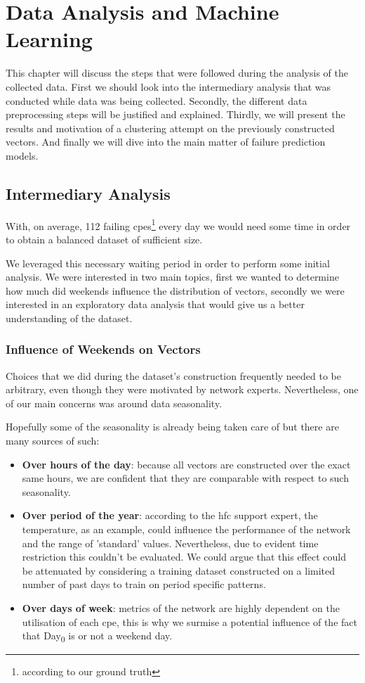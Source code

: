 \chapter{Data Analysis and Machine Learning}
This chapter will discuss the steps that were followed during the analysis of the collected data. First we should look into the intermediary analysis that was conducted while data was being collected. Secondly, the different data preprocessing steps will be justified and explained. Thirdly, we will present the results and motivation of a clustering attempt on the previously constructed vectors. And finally we will dive into the main matter of failure prediction models. 

\section{Intermediary Analysis}
With, on average, 112 failing \acrshort{cpe}s\footnote{according to our ground truth} every day we would need some time in order to obtain a balanced dataset of sufficient size.

We leveraged this necessary waiting period in order to perform some initial analysis. We were interested in two main topics, first we wanted to determine how much did weekends influence the distribution of vectors, secondly we were interested in an exploratory data analysis that would give us a better understanding of the dataset. 

\subsection{Influence of Weekends on Vectors} 
\label{subsec:influence}
Choices that we did during the dataset's construction frequently needed to be arbitrary, even though they were motivated by network experts. Nevertheless, one of our main concerns was around data seasonality. 

Hopefully some of the seasonality is already being taken care of but there are many sources of such:
\begin{itemize}[topsep=0pt]
	\item \textbf{Over hours of the day}: because all vectors are constructed over the exact same hours, we are confident that they are comparable with respect to such seasonality. 
	\item \textbf{Over period of the year}: according to the \acrshort{hfc} support expert, the temperature, as an example, could influence the performance of the network and the range of 'standard' values. Nevertheless, due to evident time restriction this couldn't be evaluated. We could argue that this  effect could be attenuated by considering a training dataset constructed on a limited number of past days to train on period specific patterns. 
	\item \textbf{Over days of week}: metrics of the network are highly dependent on the utilisation of each \acrshort{cpe}, this is why we surmise a potential influence of the fact that Day\textsubscript{0} is or not a weekend day.
\end{itemize}

